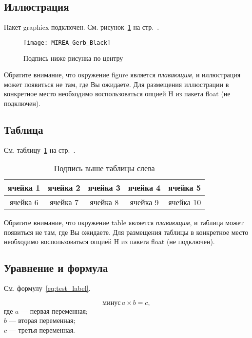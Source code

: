 \documentclass[14pt, a4paper, titlepage]{extarticle}
\begin{document}
\subsection{Иллюстрация}
 
Пакет graphicx подключен. См. рисунок~\ref{fig:test_label} на стр.~\pageref{fig:test_label}.

\begin{figure}[htb]
    \centering
    \texttt{[image: MIREA\_Gerb\_Black]}
    \parskip=6pt
    \caption{Подпись ниже рисунка по центру}
    \label{fig:test_label}
\end{figure}

Обратите внимание, что окружение figure является \emph{плавающим}, и иллюстрация может появиться не там, где Вы ожидаете. Для размещения иллюстрации в конкретное место необходимо воспользоваться опцией H из пакета float (не подключен).

\subsection{Таблица}

См. таблицу~\ref{tab:test_label} на стр.~\pageref{tab:test_label}.

\begin{table}[htb]
    \caption{Подпись выше таблицы слева}
    \centering
    \begin{tabular}{ |c|c|c|c|c| } 
        \hline
        ячейка 1 & ячейка 2 & ячейка 3 & ячейка 4 & ячейка 5 \\ \hline
        ячейка 6 & ячейка 7 & ячейка 8 & ячейка 9 & ячейка 10 \\ \hline
    \end{tabular}
    \label{tab:test_label}
\end{table}

Обратите внимание, что окружение table является \emph{плавающим}, и таблица может появиться не там, где Вы ожидаете. Для размещения таблицы в конкретное место необходимо воспользоваться опцией H из пакета float (не подключен).

\subsection{Уравнение и формула}

См. формулу~\ref{eq:test_label}.

\begin{equation}\label{eq:test_label}
    \text{минус}\,a\times b=c ,
\end{equation}
где $a$ --- первая переменная; \\
$b$ --- вторая переменная; \\
$c$ --- третья переменная.
\end{document}
